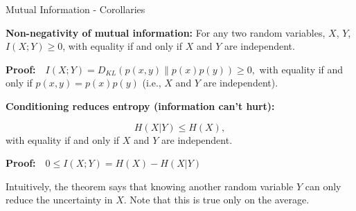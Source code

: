 \documentclass[11pt,compress,t,notes=noshow, xcolor=table]{beamer}
\begin{document}
\begin{vbframe}{Mutual Information - Corollaries}

\small

\textbf{Non-negativity of mutual information:} For any two random variables, $X$, $Y$, $ I(X;Y) \geq 0$, with equality if and only if $X$ and $Y$ are independent. 

\lz

\textbf{Proof:}$\quad I(X ; Y)=D_{KL}(p(x, y) \| p(x) p(y)) \geq 0,$ with equality if and only if $p(x, y)=p(x) p(y)$ (i.e., $X$ and $Y$ are independent).

\lz
  
\textbf{Conditioning reduces entropy (information can't hurt):}

$$H(X | Y) \leq H(X),$$
with equality if and only if $X$ and $Y$ are independent.

\lz

\textbf{Proof:}$\quad 0 \leq I(X ; Y)=H(X)-H(X | Y)$

Intuitively, the theorem says that knowing another random variable $Y$ can only reduce the uncertainty in $X$. Note that this is true only on the average. 

\framebreak









\end{vbframe}
\end{document}
